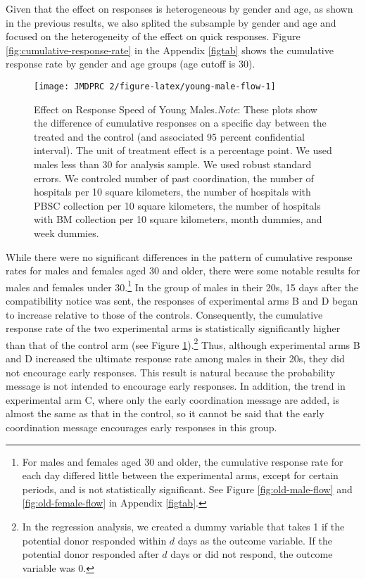 \documentclass[12pt, a4paper]{article}
\begin{document}
Given that the effect on responses is heterogeneous by gender and age, as shown in the previous results, we also splited the subsample by gender and age and focused on the heterogeneity of the effect on quick responses. Figure \ref{fig:cumulative-response-rate} in the Appendix \ref{figtab} shows the cumulative response rate by gender and age groups (age cutoff is 30).

\begin{figure}[t]
\texttt{[image: JMDPRC~2/figure-latex/young-male-flow-1]} \caption{Effect on Response Speed of Young Males.\newline \emph{Note}: These plots show the difference of cumulative responses on a specific day between the treated and the control (and associated 95 percent confidential interval). The unit of treatment effect is a percentage point. We used males less than 30 for analysis sample. We used robust standard errors. We controled number of past coordination, the number of hospitals per 10 square kilometers, the number of hospitals with PBSC collection per 10 square kilometers, the number of hospitals with BM collection per 10 square kilometers, month dummies, and week dummies.}\label{fig:young-male-flow}
\end{figure}

While there were no significant differences in the pattern of cumulative response rates for males and females aged 30 and older, there were some notable results for males and females under 30.\footnote{For males and females aged 30 and older, the cumulative response rate for each day differed little between the experimental arms, except for certain periods, and is not statistically significant. See Figure \ref{fig:old-male-flow} and \ref{fig:old-female-flow} in Appendix \ref{figtab}.} In the group of males in their 20s, 15 days after the compatibility notice was sent, the responses of experimental arms B and D began to increase relative to those of the controls. Consequently, the cumulative response rate of the two experimental arms is statistically significantly higher than that of the control arm (see Figure \ref{fig:young-male-flow}).\footnote{In the regression analysis, we created a dummy variable that takes 1 if the potential donor responded within \(d\) days as the outcome variable. If the potential donor responded after \(d\) days or did not respond, the outcome variable was 0.} Thus, although experimental arms B and D increased the ultimate response rate among males in their 20s, they did not encourage early responses. This result is natural because the probability message is not intended to encourage early responses. In addition, the trend in experimental arm C, where only the early coordination message are added, is almost the same as that in the control, so it cannot be said that the early coordination message encourages early responses in this group.
\end{document}
